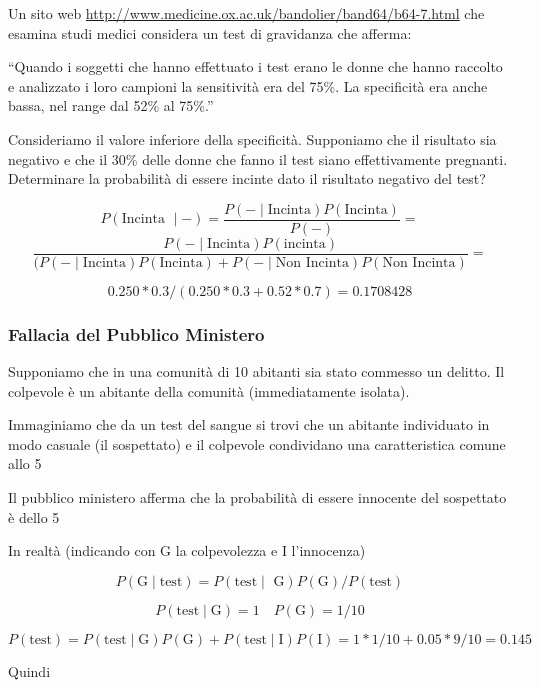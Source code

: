 \documentclass[onecolumn,12pt]{book}\usepackage[]{graphicx}\usepackage[]{color}
\begin{document}
Un sito web \url{http://www.medicine.ox.ac.uk/bandolier/band64/b64-7.html} che esamina studi medici considera un test di gravidanza che afferma:  


``Quando i soggetti che hanno effettuato i test erano le donne che hanno raccolto e analizzato i loro campioni la sensitività  era del 75\%. La specificità era anche bassa, nel range dal 52\% al 75\%.'' 

Consideriamo il valore inferiore della specificità.  Supponiamo che il risultato sia negativo e che il 30\%  delle donne che fanno il test  siano effettivamente pregnanti. Determinare la probabilità di essere incinte dato il risultato negativo del test?

$$P (\textrm{Incinta }\mid -) = \dfrac{P (-\mid \textrm{Incinta}) P (\textrm{Incinta})}{P (-)} =$$
$$\dfrac{ P (-\mid \textrm{Incinta}) P (\textrm{incinta})}{(P (-\mid \textrm{Incinta}) P (\textrm{Incinta}) + P (-\mid \textrm{Non Incinta}) P (\textrm{Non Incinta})}=$$

$$0.250*0.3 /(0.250*0.3 + 0.52*0.7)=0.1708428$$



\subsubsection{Fallacia del Pubblico Ministero}


Supponiamo  che in una comunità di 10 abitanti sia stato commesso un delitto. Il colpevole è un abitante della comunità (immediatamente isolata).


Immaginiamo che da un test del sangue si trovi che un abitante individuato in modo casuale  (il sospettato) e il colpevole condividano una caratteristica comune allo 5%

Il pubblico ministero afferma che la probabilità di essere innocente del sospettato è dello 5%


In realtà (indicando con G la colpevolezza e I l'innocenza)

$$P (\textrm{G}\mid\textrm{test}) 
= P (\textrm{test}\mid\textrm{ G})P (\textrm{G})/P (\textrm{test})$$
        
$$P (\textrm{test} \mid \textrm{G}) = 1\quad 
P (\textrm{G}) = 1/10$$
        
$$P (\textrm{test}) = P(\textrm{test}\mid  \textrm{G}) P(\textrm{G}) +
P(\textrm{test}\mid\textrm{I})P(\textrm{I}) =
1*1/10 + 0.05 *9/10 = 0.145$$
        
Quindi
\end{document}
